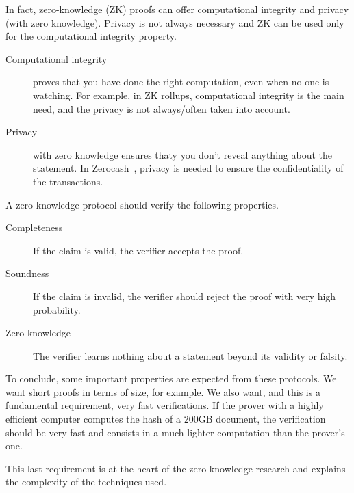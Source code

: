 In fact, zero-knowledge (ZK) proofs can offer computational integrity and privacy (with zero knowledge). Privacy is not always necessary and ZK can be used only for the computational integrity property. 
\begin{description}
    \item[Computational integrity] proves that you have done the right computation, even when no one is watching. For example, in ZK rollups,  computational integrity is the main need, and the privacy is not always/often taken into account.
    \item[Privacy] with zero knowledge ensures thaty you don't reveal anything about the statement. In Zerocash~\cite{sasson2014zerocash}, privacy is needed to ensure the confidentiality of the transactions.
\end{description}

A zero-knowledge protocol should verify the following properties.
\begin{description}
    \item[Completeness] If the claim is valid, the verifier accepts the proof.
\item[Soundness] If the claim is invalid, the verifier should reject the proof with very high probability.

\item[Zero-knowledge] The verifier learns nothing about a statement beyond its validity or falsity.
\end{description}

To conclude, some important properties are expected from these protocols. We want  short proofs in terms of size, for example. We also want, and this is a fundamental requirement, very fast verifications. If the prover with a highly efficient computer computes the hash of a 200GB document, the verification should be very fast and consists in a much lighter computation than the prover's one.

This last requirement is at the heart of the zero-knowledge research and explains the complexity of the techniques used.
